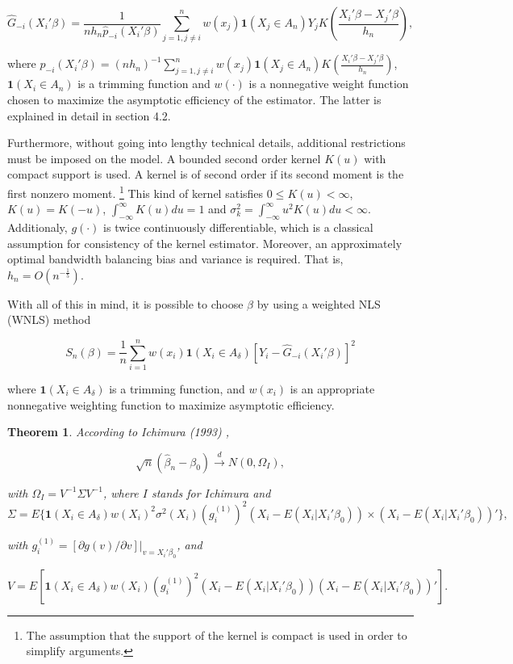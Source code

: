 \begin{equation}
\hat{G}_{-i}(X_i'\beta) = \frac{1}{nh_n\hat{p}_{-i}(X_i'\beta)}\sum_{j=1, j \neq i }^{n}  w(x_j)\mathbf{1}{(X_j \in A_n)}Y_jK\left(\frac{X_i'\beta - X_j'\beta}{h_n}\right),
\end{equation}

where $\hat{p}_{-i}(X_i'\beta) = (nh_n)^{-1}\sum_{j=1,j \neq i}^{n}w(x_j)\mathbf{1}{(X_j \in A_n)}K\left(\frac{X_i'\beta - X_j'\beta}{h_n}\right)$, \linebreak  $\mathbf{1}{(X_i \in A_n)}$ is a trimming function and $w(\cdot)$ is a nonnegative weight function chosen to maximize the asymptotic efficiency of the estimator. The latter is explained in detail in section 4.2.


Furthermore, without going into lengthy technical details, additional restrictions must be imposed on the model. A bounded second order kernel $K(u)$ with compact support is used. A kernel is of second order if its second moment is the first nonzero moment. \footnote{The assumption that the support of the kernel is compact is used in order to simplify arguments.} This kind of kernel satisfies $0 \leq K(u) < \infty$, $K(u)=K(-u)$, $\int_{- \infty}^{\infty} K(u)du = 1$ and $\sigma_k^2 = \int_{-\infty}^{\infty} u^2K(u)du < \infty$. Additionaly, $g(\cdot)$ is twice continuously differentiable, which is a classical assumption for consistency of the kernel estimator. Moreover, an approximately optimal bandwidth balancing bias and variance is required. That is, $ h_n = O(n^{-\frac{1}{5}})$.

With all of this in mind, it is possible to choose $\beta$ by using a weighted NLS (WNLS) method

\begin{equation}
S_n(\beta) = \frac{1}{n} \sum_{i=1}^{n}  w(x_i)\mathbf{1}{(X_i \in A_\delta)[Y_i - \hat{G}_{-i}(X_i'\beta)]^2}
\end{equation}

where $\mathbf{1}{(X_i \in A_\delta)}$ is a trimming function, and $w(x_i)$ is an appropriate nonnegative weighting function to maximize asymptotic efficiency.

\newtheorem{theorem}{Theorem}[section]

\begin{theorem}
According to Ichimura (1993) \cite{[6]}, 

\[ \sqrt{n}(\hat{\beta}_n - \beta_0) \stackrel{d}{\rightarrow} N(0,\Omega_I), \] 

 with $\Omega_I = V^{-1}\Sigma V^{-1}$, where $I$ stands for Ichimura and 
\[\Sigma = E\{\mathbf{1}{(X_i \in A_\delta)}w(X_i)^2\sigma^2(X_i)(g_i^{(1)})^2(X_i - E(X_i|X_i'\beta_0)) \times (X_i - E(X_i|X_i'\beta_0))'\},\]

with $g_i^{(1)} = [\partial g(v)/\partial v]|_{v = X_i'\beta_0}$, and

\[ V = E[ \mathbf{1}{(X_i \in A_\delta)} w(X_i)(g_i^{(1)})^2(X_i - E(X_i|X_i'\beta_0))(X_i - E(X_i|X_i'\beta_0))'].\]

\end{theorem}

